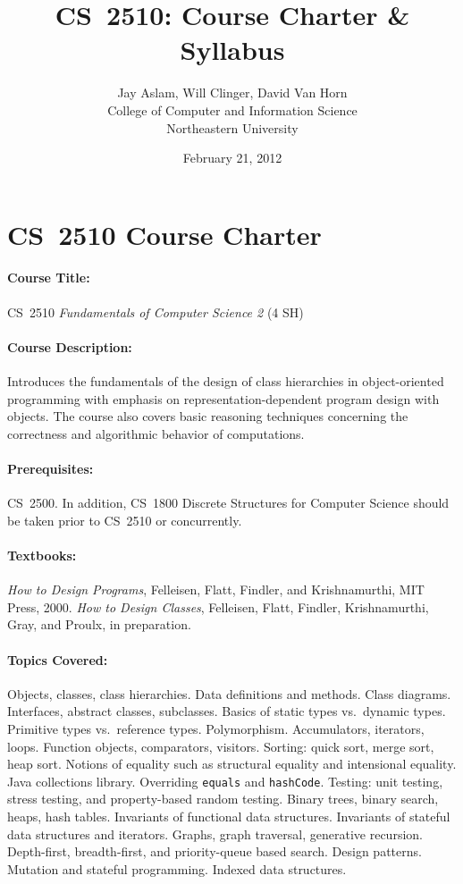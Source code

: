 \documentclass[11pt]{article}
\title{CS~2510: Course Charter \& Syllabus}
\author{Jay Aslam, Will Clinger, David Van Horn \\
        College of Computer and Information Science \\
        Northeastern University}
\date{February 21, 2012}
\begin{document}
\maketitle

\section{CS~2510 Course Charter}

\paragraph{Course Title:}
%
CS~2510 \emph{Fundamentals of Computer Science 2}	(4 SH)

\paragraph{Course Description:}
%

Introduces the fundamentals of the design of class hierarchies in
object-oriented programming with emphasis on representation-dependent
program design with objects. The course also covers basic reasoning
techniques concerning the correctness and algorithmic behavior of
computations.

\paragraph{Prerequisites:}
%
CS~2500. In addition, CS~1800 Discrete Structures for Computer Science should be taken prior to CS~2510 or concurrently.

\paragraph{Textbooks:}
%
\emph{How to Design Programs}, Felleisen, Flatt, Findler, and Krishnamurthi, MIT Press, 2000. \emph{How to Design Classes}, Felleisen, Flatt, Findler, Krishnamurthi, Gray, and Proulx, in preparation.

\paragraph{Topics Covered:}
%
Objects, classes, class hierarchies.  Data definitions and methods.
%
Class diagrams.
%
Interfaces, abstract classes, subclasses.  Basics of static
types vs.~dynamic types.  Primitive types vs.~reference types.
Polymorphism.
%
Accumulators, iterators, loops.
%
Function objects, comparators, visitors.  Sorting: quick sort, merge
sort, heap sort.  Notions of equality such as structural equality and
intensional equality.
%
Java collections library.
%
Overriding {\tt equals} and {\tt hashCode}.
%
Testing: unit testing, stress testing, and property-based random testing.
%
Binary trees, binary search, heaps, hash tables.
%
Invariants of functional data structures.  Invariants of stateful data
structures and iterators.
%
Graphs, graph traversal, generative recursion.  Depth-first,
breadth-first, and priority-queue based search.
%
Design patterns.
%
Mutation and stateful programming.
%
Indexed data structures.
\end{document}
